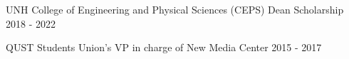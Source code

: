 UNH College of Engineering and Physical Sciences (CEPS) Dean Scholarship    \hfill 2018 - 2022


QUST Students Union's VP in charge of New Media Center 	\hfill 2015 - 2017



